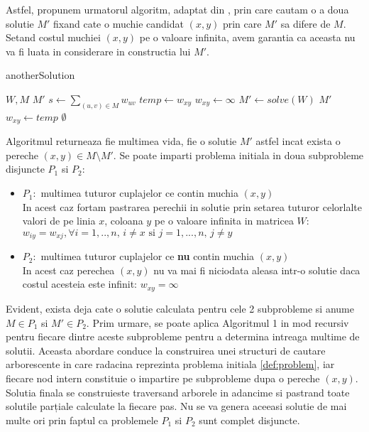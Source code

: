 Astfel, propunem urmatorul algoritm, adaptat din \cite{allmatchings}, prin care cautam o a doua
solutie $M'$ fixand cate o muchie candidat $(x, y)$ prin care $M'$ sa difere de $M$. Setand costul
muchiei $(x, y)$ pe o valoare infinita, avem garantia ca aceasta nu va fi luata in considerare in 
constructia lui $M'$.
\begin{algorithm}
\label{P}
\caption{anotherSolution}
\begin{algorithmic}[1]
\REQUIRE $W, M$
\ENSURE $M'$
  \STATE $s \gets \sum_{(u, v) \in M} w_{uv}$
    \STATE $temp \gets w_{xy}$
    \STATE $w_{xy} \gets \infty$
    \STATE $M' \gets solve(W)$
    \RETURN $M'$
    \ELSE
    \STATE $w_{xy} \gets temp$
    \ENDIF
  \ENDFOR
  \RETURN $\emptyset$
\end{algorithmic}
\end{algorithm}

Algoritmul returneaza fie multimea vida, fie o solutie $M'$ astfel incat exista o pereche $(x, y)
\in M \setminus M'$. Se poate imparti problema initiala in doua subprobleme disjuncte $P_1$ si
$P_2$:
\begin{itemize}
  \item $P_1\colon$ multimea tuturor cuplajelor ce contin muchia $(x, y)$ \\
    In acest caz fortam pastrarea perechii in solutie prin setarea tuturor celorlalte valori de pe
    linia $x$, coloana $y$ pe o valoare infinita in matricea $W$:
    $w_{iy} = w_{xj}, \forall i = 1,..,n \text{, }i \neq x  \text{ si } j = 1,...,n \text{, }j \neq y$
  \item $P_2\colon$ multimea tuturor cuplajelor ce \textbf{nu} contin muchia $(x, y)$ \\
    In acest caz perechea $(x, y)$ nu va mai fi niciodata aleasa intr-o solutie daca costul acesteia
    este infinit:
    $w_{xy} = \infty$
\end{itemize}

Evident, exista deja cate o solutie calculata pentru cele 2 subprobleme si anume $M \in P_1$ si 
$M' \in P_2$. Prim urmare, se poate aplica Algoritmul 1 in mod recursiv pentru fiecare dintre 
aceste subprobleme pentru a determina intreaga multime de solutii. Aceasta abordare conduce la
construirea unei structuri de cautare arborescente in care radacina reprezinta problema initiala
\ref{def:problem}, iar fiecare nod intern constituie o impartire pe subprobleme dupa o pereche 
$(x, y)$. Solutia finala se construieste traversand arborele in adancime si pastrand toate solutile
parțiale calculate la fiecare pas. Nu se va genera aceeasi solutie de mai multe ori prin faptul ca
problemele $P_1$ si $P_2$ sunt complet disjuncte.

